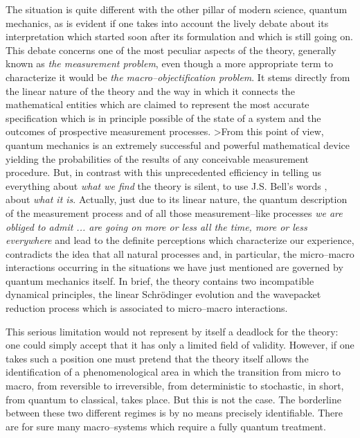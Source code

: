 \documentclass[10pt,a4paper]{article}
\begin{document}
The situation is quite different with the other pillar of modern
science, quantum mechanics, as is evident if one takes into
account the lively debate about its interpretation which started
soon after its formulation and which is still going on. This
debate concerns one of the most peculiar aspects of the theory,
generally known as {\it the measurement problem}, even though a
more appropriate term to characterize it would be {\it the
macro--objectification problem}. It stems directly from the linear
nature of the theory and the way in which it connects the
mathematical entities which are claimed to represent the most
accurate specification which is in principle possible of the state
of a system and the outcomes of prospective measurement processes.
>From this point of view, quantum mechanics is an extremely
successful and powerful mathematical device yielding the
probabilities of the  results of any conceivable measurement
procedure. But, in contrast with this unprecedented efficiency in
telling us everything about {\it what we find} the theory is
silent, to use J.S. Bell's words \cite{bellam}, about {\it what it
is}. Actually, just due to its linear nature, the quantum
description of the measurement process and of all those
measurement--like processes \cite{bellam} {\it we are obliged to
admit ... are going on more or less all the time, more or less
everywhere} and lead to the definite perceptions which
characterize our experience, contradicts the idea that  all
natural processes and, in particular, the micro--macro
interactions occurring in the situations we have just mentioned
are governed by quantum mechanics itself. In brief, the theory
contains two incompatible dynamical principles, the linear
Schr\"odinger evolution and the wavepacket reduction  process
which is associated to micro--macro interactions.

This serious limitation would not represent by itself a deadlock
for the theory: one could simply accept that it has only a limited
field of validity. However, if one takes such a position one must
pretend that the theory itself allows the identification of a
phenomenological area in which the transition from micro to macro,
from reversible to irreversible, from deterministic to stochastic,
in short, from quantum to classical, takes place. But this is not
the case. The borderline between these two different regimes is by
no means precisely identifiable. There are for sure many
macro--systems which require a fully quantum treatment.
\end{document}
